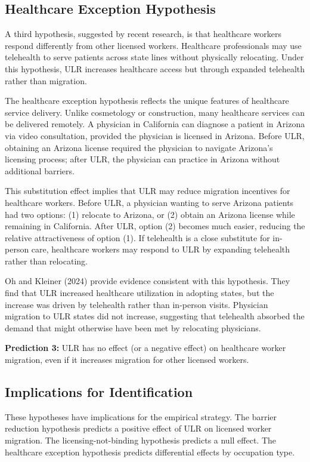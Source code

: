 \documentclass[12pt]{article}
\begin{document}
\subsection{Healthcare Exception Hypothesis}

A third hypothesis, suggested by recent research, is that healthcare workers respond differently from other licensed workers. Healthcare professionals may use telehealth to serve patients across state lines without physically relocating. Under this hypothesis, ULR increases healthcare access but through expanded telehealth rather than migration.

The healthcare exception hypothesis reflects the unique features of healthcare service delivery. Unlike cosmetology or construction, many healthcare services can be delivered remotely. A physician in California can diagnose a patient in Arizona via video consultation, provided the physician is licensed in Arizona. Before ULR, obtaining an Arizona license required the physician to navigate Arizona's licensing process; after ULR, the physician can practice in Arizona without additional barriers.

This substitution effect implies that ULR may reduce migration incentives for healthcare workers. Before ULR, a physician wanting to serve Arizona patients had two options: (1) relocate to Arizona, or (2) obtain an Arizona license while remaining in California. After ULR, option (2) becomes much easier, reducing the relative attractiveness of option (1). If telehealth is a close substitute for in-person care, healthcare workers may respond to ULR by expanding telehealth rather than relocating.

Oh and Kleiner (2024) provide evidence consistent with this hypothesis. They find that ULR increased healthcare utilization in adopting states, but the increase was driven by telehealth rather than in-person visits. Physician migration to ULR states did not increase, suggesting that telehealth absorbed the demand that might otherwise have been met by relocating physicians.

\textbf{Prediction 3:} ULR has no effect (or a negative effect) on healthcare worker migration, even if it increases migration for other licensed workers.

\subsection{Implications for Identification}

These hypotheses have implications for the empirical strategy. The barrier reduction hypothesis predicts a positive effect of ULR on licensed worker migration. The licensing-not-binding hypothesis predicts a null effect. The healthcare exception hypothesis predicts differential effects by occupation type.
\end{document}
